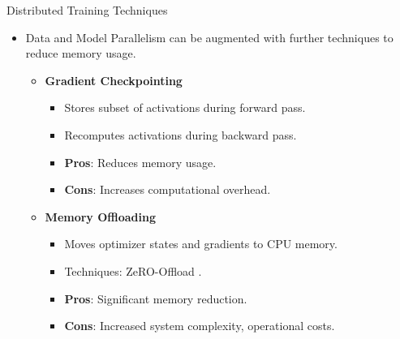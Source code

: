 \documentclass{beamer}
\begin{document}
\begin{frame}{Distributed Training Techniques}
    \begin{itemize}
        \item Data and Model Parallelism can be augmented with further techniques to reduce memory usage.
        \vspace{0.5em}
        \begin{itemize}
            \item \textbf{Gradient Checkpointing} \citep{chenTrainingDeepNets2016}
            \begin{itemize}
                \item Stores subset of activations during forward pass.
                \item Recomputes activations during backward pass.
                \item \textbf{Pros}: Reduces memory usage.
                \item \textbf{Cons}: Increases computational overhead.
            \end{itemize}
            \vspace{0.5em}
            \item \textbf{Memory Offloading}
            \begin{itemize}
                \item Moves optimizer states and gradients to CPU memory.
                \item Techniques: ZeRO-Offload \citep{rajbhandariZeROMemoryOptimizations2020}.
                \item \textbf{Pros}: Significant memory reduction.
                \item \textbf{Cons}: Increased system complexity, operational costs.
            \end{itemize}
        \end{itemize}
    \end{itemize}
\end{frame}
\end{document}
